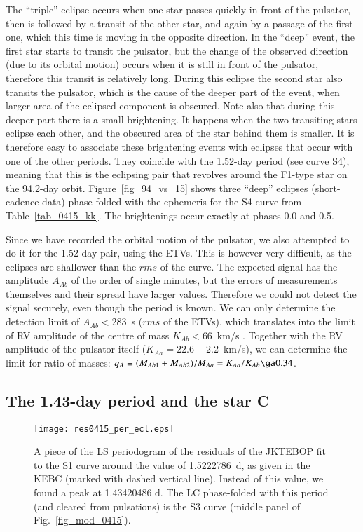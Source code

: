 \documentclass{aa}
\begin{document}
The ``triple'' eclipse occurs when one star passes quickly in front of the
pulsator, then is followed by a transit of the other star, and again by a 
passage of the first one, which this time is moving in the opposite direction.
In the ``deep'' event, the first star starts to transit the pulsator, but 
the change of the observed direction (due to its orbital motion) occurs when 
it is still in front of the pulsator, therefore this transit is relatively
long. During this eclipse the second star also transits the pulsator, which
is the cause of the deeper part of the event, when larger area of the eclipsed
component is obscured. Note also that during this deeper part there is a 
small brightening. It happens when the two transiting stars eclipse each other,
and the obscured area of the star behind them is smaller. It is therefore 
easy to associate these brightening events with eclipses that occur with one 
of the other periods. They coincide with the 1.52-day period (see curve S4), 
meaning that this is the eclipsing pair that revolves around the F1-type star on 
the 94.2-day orbit. Figure~\ref{fig_94_vs_15} shows three ``deep'' eclipses 
(short-cadence data) phase-folded with the ephemeris for the S4 curve from 
Table~\ref{tab_0415_kk}. The brightenings occur exactly at phases 0.0 and 0.5.

Since we have recorded the orbital motion of the pulsator, we also attempted
to do it for the 1.52-day pair, using the ETVs. This is however very difficult, 
as the eclipses are shallower than the $rms$ of the curve. The expected signal
has the amplitude $A_{Ab}$ of the order of single minutes, but the errors of measurements
themselves and their spread have larger values. Therefore we could not detect the 
signal securely, even though the period is known. We can only determine the 
detection limit of $A_{Ab}<283$~s ($rms$ of the ETVs), which translates into the 
limit of RV amplitude of the centre of mass $K_{Ab}<66$~km/s 
\citep[from Eq.~8 in][]{hel16}. Together with the RV amplitude of the pulsator
itself ($K_{Aa}=22.6\pm2.2$~km/s), we can determine the limit for ratio of masses:
$q_{A} \equiv (M_{Ab1}+M_{Ab2})/M_{Aa} = K_{Aa}/K_{Ab} \ga 0.34$.

\subsection{The 1.43-day period and the star C}\label{sec_per_1.43}

\begin{figure}
\centering
\texttt{[image: res0415\_per\_ecl.eps]}
\caption{A piece of the LS periodogram of the residuals
of the JKTEBOP fit to the S1 curve around the value of 1.5222786~d,
as given in the KEBC (marked with dashed vertical line). Instead of
this value, we found a peak at 1.43420486 d. The LC phase-folded
with this period (and cleared from pulsations) is the S3 curve 
(middle panel of Fig.~\ref{fig_mod_0415}).}\label{fig_per_1.43}
\end{figure}
\end{document}
